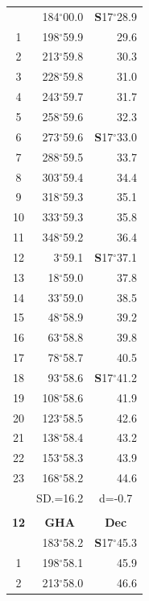 \documentclass[10pt, a4paper]{report}
\begin{document}
\begin{scriptsize}
\begin{tabular*}{0.2\textwidth}[t]{@{\extracolsep{\fill}}|c|rr|}
\hline\rule{0pt}{2.6ex}\noindent
0 & 184$^\circ$00.0 & \textbf{S}17$^\circ$28.9\\
1 & 198$^\circ$59.9 & 29.6\\
2 & 213$^\circ$59.8 & 30.3\\
3 & 228$^\circ$59.8 & \raisebox{0.24ex}{\boldmath$\cdot$~\boldmath$\cdot$~~}31.0\\
4 & 243$^\circ$59.7 & 31.7\\
5 & 258$^\circ$59.6 & 32.3\\[2Pt]
6 & 273$^\circ$59.6 & \textbf{S}17$^\circ$33.0\\
7 & 288$^\circ$59.5 & 33.7\\
8 & 303$^\circ$59.4 & 34.4\\
9 & 318$^\circ$59.3 & \raisebox{0.24ex}{\boldmath$\cdot$~\boldmath$\cdot$~~}35.1\\
10 & 333$^\circ$59.3 & 35.8\\
11 & 348$^\circ$59.2 & 36.4\\[2Pt]
12 & 3$^\circ$59.1 & \textbf{S}17$^\circ$37.1\\
13 & 18$^\circ$59.0 & 37.8\\
14 & 33$^\circ$59.0 & 38.5\\
15 & 48$^\circ$58.9 & \raisebox{0.24ex}{\boldmath$\cdot$~\boldmath$\cdot$~~}39.2\\
16 & 63$^\circ$58.8 & 39.8\\
17 & 78$^\circ$58.7 & 40.5\\[2Pt]
18 & 93$^\circ$58.6 & \textbf{S}17$^\circ$41.2\\
19 & 108$^\circ$58.6 & 41.9\\
20 & 123$^\circ$58.5 & 42.6\\
21 & 138$^\circ$58.4 & \raisebox{0.24ex}{\boldmath$\cdot$~\boldmath$\cdot$~~}43.2\\
22 & 153$^\circ$58.3 & 43.9\\
23 & 168$^\circ$58.2 & 44.6\\
\hline
\rule{0pt}{2.4ex} & \multicolumn{1}{c}{SD.=16.2} & \multicolumn{1}{c|}{d=-0.7}\\
\hline
\multicolumn{1}{c}{}\\[-0.5ex]\hline
\multicolumn{1}{|c|}{\rule{0pt}{2.6ex}\textbf{12}} & \multicolumn{1}{c}{\textbf{GHA}} & \multicolumn{1}{c|}{\textbf{Dec}}\\
\hline\rule{0pt}{2.6ex}\noindent
0 & 183$^\circ$58.2 & \textbf{S}17$^\circ$45.3\\
1 & 198$^\circ$58.1 & 45.9\\
2 & 213$^\circ$58.0 & 46.6\\

\end{tabular*}
\end{scriptsize}
\end{document}
